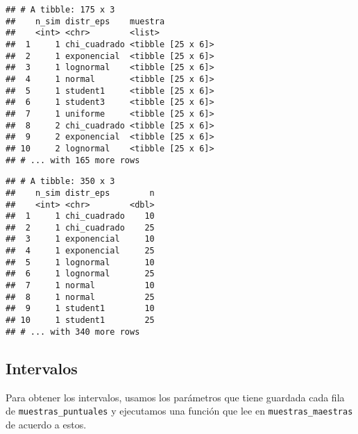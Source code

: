 \documentclass[]{article}
\newenvironment{Shaded}{\begin{snugshade}}{\end{snugshade}}
\newcommand{\CommentTok}[1]{\textcolor[rgb]{0.56,0.35,0.01}{\textit{#1}}}
\newcommand{\DataTypeTok}[1]{\textcolor[rgb]{0.13,0.29,0.53}{#1}}
\newcommand{\DecValTok}[1]{\textcolor[rgb]{0.00,0.00,0.81}{#1}}
\newcommand{\KeywordTok}[1]{\textcolor[rgb]{0.13,0.29,0.53}{\textbf{#1}}}
\newcommand{\NormalTok}[1]{#1}
\newcommand{\OperatorTok}[1]{\textcolor[rgb]{0.81,0.36,0.00}{\textbf{#1}}}
\newcommand{\StringTok}[1]{\textcolor[rgb]{0.31,0.60,0.02}{#1}}
\begin{document}
\begin{verbatim}
## # A tibble: 175 x 3
##    n_sim distr_eps    muestra          
##    <int> <chr>        <list>           
##  1     1 chi_cuadrado <tibble [25 x 6]>
##  2     1 exponencial  <tibble [25 x 6]>
##  3     1 lognormal    <tibble [25 x 6]>
##  4     1 normal       <tibble [25 x 6]>
##  5     1 student1     <tibble [25 x 6]>
##  6     1 student3     <tibble [25 x 6]>
##  7     1 uniforme     <tibble [25 x 6]>
##  8     2 chi_cuadrado <tibble [25 x 6]>
##  9     2 exponencial  <tibble [25 x 6]>
## 10     2 lognormal    <tibble [25 x 6]>
## # ... with 165 more rows
\end{verbatim}

\begin{Shaded}
\end{Shaded}

\begin{verbatim}
## # A tibble: 350 x 3
##    n_sim distr_eps        n
##    <int> <chr>        <dbl>
##  1     1 chi_cuadrado    10
##  2     1 chi_cuadrado    25
##  3     1 exponencial     10
##  4     1 exponencial     25
##  5     1 lognormal       10
##  6     1 lognormal       25
##  7     1 normal          10
##  8     1 normal          25
##  9     1 student1        10
## 10     1 student1        25
## # ... with 340 more rows
\end{verbatim}

\hypertarget{intervalos}{%
\subsection{Intervalos}\label{intervalos}}

Para obtener los intervalos, usamos los parámetros que tiene guardada
cada fila de \texttt{muestras\_puntuales} y ejecutamos una función que
lee en \texttt{muestras\_maestras} de acuerdo a estos.
\end{document}
